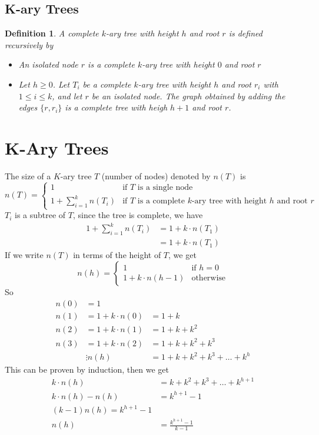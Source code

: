 \documentclass[openany]{report}
\newtheorem{definition}{Definition}[section]
\begin{document}
\section{K-ary Trees}
\begin{definition}
    A complete $k$-ary tree with height $h$ and root $r$ is defined recursively by 
    \begin{itemize}
        \item An isolated node $r$ is a complete $k$-ary tree with height $0$ and root $r$
        \item Let $h \geq 0$. Let $T_i$ be a complete $k$-ary tree with height $h$ and root $r_i$ with $1 \leq i \leq k$, and let $r$ be an isolated node. The graph obtained by adding the edges $\{r,r_i\}$ is a complete tree with heigh $h+1$ and root $r$.
    \end{itemize}
\end{definition}


\chapter{K-Ary Trees}
The size of a $K$-ary tree $T$ (number of nodes) denoted by $n(T)$ is 
\[n(T) = \begin{cases}
    1 & \text{if $T$ is a single node}\\
    1 + \sum\limits_{i=1}^k n(T_i) & \text{if $T$ is a complete $k$-ary tree with height $h$ and root $r$}
\end{cases}\]
$T_i$ is a subtree of $T$, since the tree is complete, we have 
\begin{align*}
    1 + \sum_{i=1}^k n(T_i) &= 1 + k \cdot n(T_1)\\  
    &= 1 + k \cdot n(T_1)
\end{align*}
If we write $n(T)$ in terms of the height of $T$, we get 
\[n(h) = \begin{cases}
    1 & \text{if $h = 0$}\\
    1 + k \cdot n(h-1) & \text{otherwise}
\end{cases}\]
So 
\begin{align*}
    n(0) &= 1\\
    n(1) &= 1 + k \cdot n(0) &= 1 + k\\
    n(2) &= 1 + k \cdot n(1) &= 1 + k + k^2\\
    n(3) &= 1 + k \cdot n(2) &= 1 + k + k^2 + k^3\\
    &\vdots
    n(h) &= 1 + k + k^2 + k^3 + \ldots + k^h
\end{align*}
This can be proven by induction, then we get 
\begin{align*}
    k\cdot n(h) &= k + k^2 + k^3 + \ldots + k^{h+1}\\
    k\cdot n(h) - n(h) &= k^{h+1} - 1\\
    (k-1)n(h) = k^{h+1} - 1\\
    n(h) &= \frac{k^{h+1} - 1}{k-1}
\end{align*}
\end{document}
